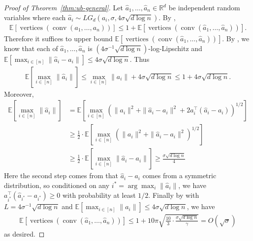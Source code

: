 \documentclass{theoretics}
\newcommand{\R}{\mathbb R}
\newcommand{\E}{\mathbb E}
\newcommand{\conv}{\operatorname{conv}}
\newcommand{\verts}{\operatorname{vertices}}
\begin{document}
\begin{proof}[Proof of Theorem~\ref{thm:ub-general}]
    Let $\hat{a}_1, \ldots, \hat{a}_n \in \R^d$ be independent random variables where each $\hat{a}_i \sim LG_d(a_i, \sigma, 4\sigma \sqrt{d\log n})$. By , 
    \begin{align*}
        \E[\verts(\conv(a_1, \ldots, a_n))]  \leq 1 + \E[\verts(\conv(\hat{a}_1, \ldots, \hat{a}_n))].
    \end{align*}
    Therefore it suffices to upper bound $\E[\verts(\conv(\hat{a}_1, \ldots, \hat{a}_n))]$.
    By , we know that each of $\hat{a}_1, \ldots, \hat{a}_n$ is $(4\sigma^{-1} \sqrt{d\log n})$-log-Lipschitz and $\E[\max_{i\in [n]}\|\hat{a}_i - a_i\|] \leq 4\sigma \sqrt{d\log n}$. Thus
    \begin{align*}
        \E[\max_{i\in [n]}\|\hat{a}_i\|] \leq \max_{i\in [n]} \|a_i\| + 4\sigma \sqrt{d\log n} \leq 1 + 4\sigma \sqrt{d\log n}.
    \end{align*}
    Moreover, 
    \begin{align*}
        \E[\max_{i\in [n]}\|\hat{a}_i\|] &= \E[\max_{i\in [n]}(\|a_i\|^2 + \|\hat{a}_i - a_i\|^2 + 2a_i^\top (\hat{a}_i - a_i))^{1/2}] \\
        &\geq \frac{1}{2}\cdot \E[\max_{i\in [n]}(\|a_i\|^2 + \|\hat{a}_i - a_i\|^2)^{1/2}] \\
        &\geq \frac{1}{2}\cdot \E[\max_{i\in [n]} \|\hat{a}_i - a_i\|] \geq \frac{\sigma \sqrt{d\log n}}{4}
    \end{align*}
    Here the second step comes from that $\hat{a}_i - a_i$ comes from a symmetric distribution, so conditioned on any $i^* = \arg \max_i \|\hat{a}_i\|$, we have $a_{i^*}^\top (\hat{a}_{i^*} - a_{i^*}) \geq 0$ with probability at least $1/2$.
    Finally by  with $L = 4\sigma^{-1} \sqrt{d\log n}$ and $\E[\max_{i \in [n]} \|a_i\|] \leq 4\sigma \sqrt{d\log n}$, we have
    \begin{align*}
         \E\left[ \verts\left(\conv(\hat{a}_1, \ldots, \hat{a}_n) \right) \right] 
         \leq  1 + 10\pi \sqrt{\frac{10}{3} \cdot \frac{\sigma \sqrt{d\log n}}{\gamma}} = O(\sqrt{\sigma} )
    \end{align*}
    as desired.
\end{proof}
\fi
\end{document}
